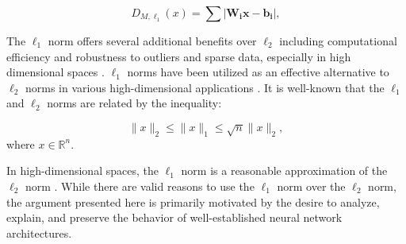 \begin{equation}
    \label{eq:mahalanobis_L1}
    D_{M,\ell_1}(x) = \sum \left| \mathbf{W_i} \mathbf{x} - \mathbf{b_i} \right|,
\end{equation}

The $\ell_1$ norm offers several additional benefits over $\ell_2$ including computational efficiency and robustness to outliers and sparse data, especially in high dimensional spaces \cite{boyd2004convex, horn2012matrix}. $\ell_1$ norms have been utilized as an effective alternative to $\ell_2$ norms in various high-dimensional applications \citep{bernhardsson2018annoy, tibshirani1996lasso}. It is well-known that the $\ell_1$ and $\ell_2$ norms are related by the inequality:

\[
\|x\|_2 \leq \|x\|_1 \leq \sqrt{n} \|x\|_2,
\]
where \( x \in \mathbb{R}^n \). 

In high-dimensional spaces, the $\ell_1$ norm is a reasonable approximation of the $\ell_2$ norm \cite{vershynin2018high}. While there are valid reasons to use the $\ell_1$ norm over the $\ell_2$ norm, the argument presented here is primarily motivated by the desire to analyze, explain, and preserve the behavior of well-established neural network architectures.